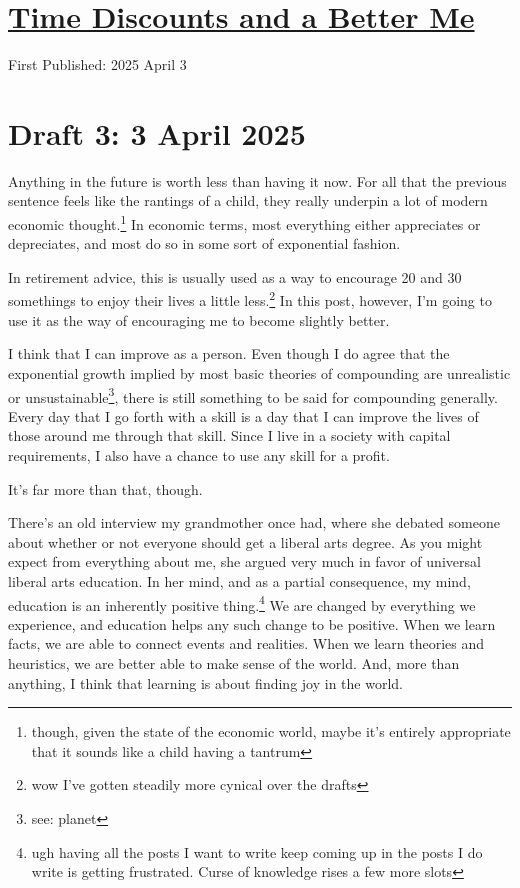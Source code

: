\documentclass[12pt]{article}[titlepage]
\newcommand{\1}{\={a}}
\newcommand{\2}{\={e}}
\newcommand{\3}{\={\i}}
\newcommand{\4}{\=o}
\newcommand{\5}{\=u}
\newcommand{\6}{\={A}}
\renewcommand{\,}{\textsuperscript{,}}
\begin{document}
\doublespacing
\section{\href{time-discounts.html}{Time Discounts and a Better Me}}
First Published: 2025 April 3
\section{Draft 3: 3 April 2025}  
Anything in the future is worth less than having it now.  
For all that the previous sentence feels like the rantings of a child, they really underpin a lot of modern economic thought.\footnote{though, given the state of the economic world, maybe it's entirely appropriate that it sounds like a child having a tantrum}  
In economic terms, most everything either appreciates or depreciates, and most do so in some sort of exponential fashion.

In retirement advice, this is usually used as a way to encourage 20 and 30 somethings to enjoy their lives a little less.\footnote{wow I've gotten steadily more cynical over the drafts}  
In this post, however, I'm going to use it as the way of encouraging me to become slightly better.

I think that I can improve as a person.  
Even though I do agree that the exponential growth implied by most basic theories of compounding are unrealistic or unsustainable\footnote{see: planet}, there is still something to be said for compounding generally.  
Every day that I go forth with a skill is a day that I can improve the lives of those around me through that skill.  
Since I live in a society with capital requirements, I also have a chance to use any skill for a profit.

It's far more than that, though.

There's an old interview my grandmother once had, where she debated someone about whether or not everyone should get a liberal arts degree.  
As you might expect from everything about me, she argued very much in favor of universal liberal arts education.  
In her mind, and as a partial consequence, my mind, education is an inherently positive thing.\footnote{ugh having all the posts I want to write keep coming up in the posts I do write is getting frustrated. Curse of knowledge rises a few more slots}  
We are changed by everything we experience, and education helps any such change to be positive.  
When we learn facts, we are able to connect events and realities.  
When we learn theories and heuristics, we are better able to make sense of the world.  
And, more than anything, I think that learning is about finding joy in the world.
\end{document}

